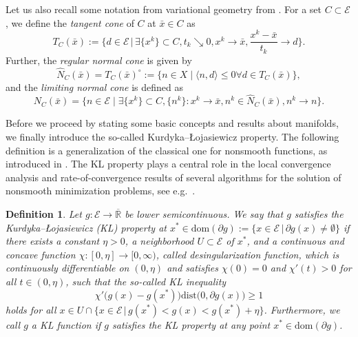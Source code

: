 \documentclass[a4paper, 12pt]{article}
\numberwithin{equation}{section}
\theoremstyle{bolddef}
\newtheorem{definition}{Definition}[section]
\theoremstyle{definition}
\theoremstyle{boldplain}
\newcommand{\xk}{x^k}
\newcommand{\X}{\mathcal{E}}
\newcommand{\dist}{\mathrm{dist}}
\begin{document}
Let us also recall some notation from variational geometry from \cite{RockafellarWets2009}. For a set $C \subset \X$, we define the \emph{tangent cone} of $C$ at $\bar x \in C$ as 
\begin{equation*}
	T_C(\bar x) := \Big\{ d \in \X\, \Big|\, \exists \{ \xk \} \subset C, t_k \searrow 0, \xk \to \bar x, \frac{\xk - \bar x}{t_k} \to d\Big\}.
\end{equation*}
Further, the \emph{regular normal cone} is given by 
\begin{equation*}
	\hat N_C(\bar x) = T_C(\bar x)^\circ := \{ n \in X \mid \langle n, d \rangle \leq 0 \forall d \in T_C(\bar x)\},
\end{equation*}
and the \emph{limiting normal cone} is defined as 
\begin{equation*}
	N_C(\bar x) = \{ n \in \X \mid \exists \{\xk\} \subset C, \{ n^k\}: \xk \to \bar x, n^k \in \hat N_C(\bar x), n^k \to n\}.
\end{equation*}


Before we proceed by stating some basic concepts and results about manifolds, we finally introduce the so-called Kurdyka–Łojasiewicz property. The following definition is a generalization of the classical 
one for nonsmooth functions, as introduced in \cite{AttouchBolteRedontSoubeyran2010,BolteDaniilidisLewis2007,BolteDaniilidisLewisShiota2007}.
The KL property plays a central role in the local
convergence analysis and rate-of-convergence results of several algorithms for the solution of 
nonsmooth minimization problems, see e.g.\ \cite{attouch2009convergence,Qian2024}.

\begin{definition}\label{def:klproperty}
Let $g: \X \to \overline{\mathbb{R}}$ be lower semicontinuous. We say that $g$ satisfies the {\normalfont Kurdyka–Łojasiewicz (KL) property} at $x^* \in \text{dom}(\partial g) :=
\{x \in \X \, | \, \partial g(x) \neq \emptyset\}$ if there exists a constant $\eta > 0$, a neighborhood $U \subset \X$ of $x^*$, and a continuous and concave function $\chi : [0, \eta] \to [0, \infty)$, called {\normalfont desingularization function}, which is continuously differentiable on $(0, \eta)$ and satisfies $\chi(0)=0$ and $\chi'(t) > 0$ for all $t \in(0, \eta)$, such that the so-called KL inequality 
\begin{equation}\label{eq:klineq}
	\chi' \big( g(x) - g(x^*) \big) \dist \big( 0, \partial g(x)
	\big) \geq 1
\end{equation}
holds for all $x \in U \cap \{x \in \X \, | 
\, g(x^*) < g(x) < g(x^*) + \eta\}$. Furthermore, we call $ g $ a
\emph{KL function} if $ g $ satisfies the KL property at any point
$ x^*  \in \text{dom}(\partial g) $.
\end{definition}
\end{document}
